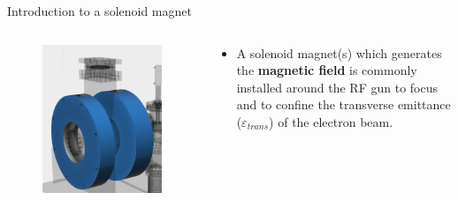 \documentclass[aspectratio=169]{beamer}
\begin{document}
\begin{frame}{Introduction to a solenoid magnet}
\begin{columns}
\begin{column}{0.4\textwidth}
    \begin{figure}
    \centering
        \includegraphics[height=1\textwidth]{beamline4.png}
    \end{figure}
\end{column}
\begin{column}{0.6\textwidth}
\begin{itemize}
\item A solenoid magnet(s) which generates the \textbf{magnetic field} is commonly installed around the RF gun to focus and to confine the transverse emittance ($\varepsilon_{trans}$) of the electron beam. 
\end{itemize}
\end{column}
\end{columns}
\end{frame}
\end{document}
